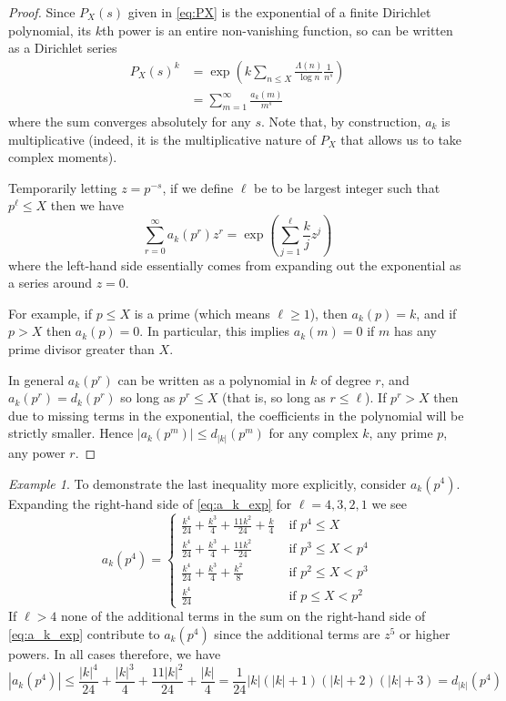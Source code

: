 \documentclass[12pt,a4paper,reqno]{amsart}
\theoremstyle{remark}
\newtheorem*{example}{Example}
\numberwithin{equation}{section}
\begin{document}
\begin{proof}
Since $P_X(s)$ given in \eqref{eq:PX} is the exponential of a finite Dirichlet polynomial, its $k$th power is an entire non-vanishing function, so can be written as a Dirichlet series
\begin{align*}
P_X(s)^k &= \exp\left(k \sum_{n\leq X}  \frac{\Lambda(n)  }{\log n}\frac{1}{n^s} \right)\\
&= \sum_{m=1}^\infty \frac{a_k(m)}{m^s}
\end{align*}
where the sum converges absolutely for any $s$. Note that, by construction, $a_k$ is multiplicative (indeed, it is the multiplicative nature of $P_X$ that allows us to take complex moments).

Temporarily letting $z=p^{-s}$, if we define $\ell$ be to be largest integer such that $p^\ell \leq X$ then we have
\begin{equation}\label{eq:a_k_exp}
\sum_{r=0}^\infty a_k(p^r) z^r = \exp\left(\sum_{j=1}^\ell \frac{k}{j} z^j \right)
\end{equation}
where the left-hand side essentially comes from expanding out the exponential as a series around $z=0$.

For example, if $p\leq X$ is a prime (which means $\ell \geq 1$), then $a_k(p)=k$, and if $p>X$ then $a_k(p)=0$. In particular, this implies $a_k(m)=0$ if $m$ has any prime divisor greater than $X$.

In general $a_k(p^r)$ can be written as a polynomial in $k$ of degree $r$, and $a_k(p^r) = d_k(p^r)$ so long as $p^r \leq X$ (that is, so long as $r\leq \ell$). If $p^r > X$ then due to missing terms in the exponential, the coefficients in the polynomial will be strictly smaller. Hence $|a_k(p^m)| \leq d_{|k|}(p^m)$ for any complex $k$, any prime $p$, any power $r$.
\end{proof}

\begin{example}
To demonstrate the last inequality more explicitly, consider $a_k(p^4)$. Expanding the right-hand side of \eqref{eq:a_k_exp} for $\ell=4,3,2,1$ we see
\[
a_k(p^4) = 
\begin{cases}
    \frac{k^4}{24}+\frac{k^3}{4}+\frac{11 k^2}{24}+\frac{k}{4} & \text{ if } p^4 \leq X \\ 
    \frac{k^4}{24}+\frac{k^3}{4}+\frac{11 k^2}{24}  & \text{ if } p^3 \leq X < p^4\\
    \frac{k^4}{24}+\frac{k^3}{4}+\frac{k^2}{8}  & \text{ if } p^2 \leq X < p^3\\
   \frac{k^4}{24}  & \text{ if } p \leq X < p^2
\end{cases}
\]
If $\ell >4$ none of the additional terms in the sum on the right-hand side of \eqref{eq:a_k_exp} contribute to $a_k(p^4)$ since the additional terms are $z^5$ or higher powers. In all cases therefore, we have
\[
|a_k(p^4)| \leq  \frac{|k|^4}{24}+\frac{|k|^3}{4}+\frac{11 |k|^2}{24}+\frac{|k|}{4} = \frac{1}{24} \left\lvert k\right\rvert \left(\left\lvert k\right\rvert+1\right) \left(\left\lvert k\right\rvert+2\right) \left(\left\lvert k\right\rvert+3\right) = d_{\lvert k \rvert}(p^4)
\]
\end{example}
\end{document}
